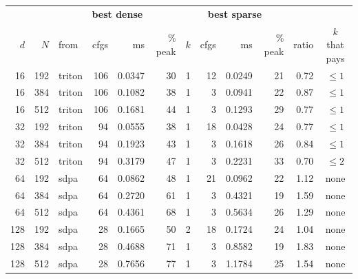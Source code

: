 \begin{tabular}{rr lrrr rrrr r c}
\toprule
& & \multicolumn{4}{c}{\textbf{best dense}} &
    \multicolumn{4}{c}{\textbf{best sparse}} & & \\
\cmidrule(lr){3-6}\cmidrule(lr){7-10}
$d$ & $N$ & from & cfgs & ms & \% peak & $k$ & cfgs & ms & \% peak & ratio
& $k$ that pays \\
\midrule
16 & 192 & triton & 106 & 0.0347 & 30 & 1 & 12 & 0.0249 & 21 & 0.72 & $\le 1$ \\
16 & 384 & triton & 106 & 0.1082 & 38 & 1 & 3 & 0.0941 & 22 & 0.87 & $\le 1$ \\
16 & 512 & triton & 106 & 0.1681 & 44 & 1 & 3 & 0.1293 & 29 & 0.77 & $\le 1$ \\
32 & 192 & triton & 94 & 0.0555 & 38 & 1 & 18 & 0.0428 & 24 & 0.77 & $\le 1$ \\
32 & 384 & triton & 94 & 0.1923 & 43 & 1 & 3 & 0.1618 & 26 & 0.84 & $\le 1$ \\
32 & 512 & triton & 94 & 0.3179 & 47 & 1 & 3 & 0.2231 & 33 & 0.70 & $\le 2$ \\
64 & 192 & sdpa & 64 & 0.0862 & 48 & 1 & 21 & 0.0962 & 22 & 1.12 & none \\
64 & 384 & sdpa & 64 & 0.2720 & 61 & 1 & 3 & 0.4321 & 19 & 1.59 & none \\
64 & 512 & sdpa & 64 & 0.4361 & 68 & 1 & 3 & 0.5634 & 26 & 1.29 & none \\
128 & 192 & sdpa & 28 & 0.1665 & 50 & 2 & 18 & 0.1724 & 24 & 1.04 & none \\
128 & 384 & sdpa & 28 & 0.4688 & 71 & 1 & 3 & 0.8582 & 19 & 1.83 & none \\
128 & 512 & sdpa & 28 & 0.7656 & 77 & 1 & 3 & 1.1784 & 25 & 1.54 & none \\
\bottomrule
\end{tabular}%
